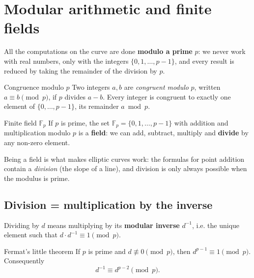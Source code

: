 
\section{Modular arithmetic and finite fields}
\label{sec:modarith}

All the computations on the curve are done \textbf{modulo a prime} $p$: we never work with real numbers, only with the integers $\{0, 1, \ldots, p-1\}$, and every result is reduced by taking the remainder of the division by $p$.

\begin{frameddefn}[label={def:congruence}]{Congruence modulo $p$}
  Two integers $a, b$ are \textit{congruent modulo} $p$, written $a \equiv b \pmod p$, if $p$ divides $a - b$. Every integer is congruent to exactly one element of $\{0, \ldots, p-1\}$, its remainder $a \bmod p$.
\end{frameddefn}

\begin{frameddefn}[label={def:field}]{Finite field $\mathbb{F}_p$}
  If $p$ is prime, the set $\mathbb{F}_p = \{0, 1, \ldots, p-1\}$ with addition and multiplication modulo $p$ is a \textbf{field}: we can add, subtract, multiply and \textbf{divide} by any non-zero element.
\end{frameddefn}

Being a field is what makes elliptic curves work: the formulas for point addition contain a \textit{division} (the slope of a line), and division is only always possible when the modulus is prime.

\subsection{Division = multiplication by the inverse}

Dividing by $d$ means multiplying by its \textbf{modular inverse} $d^{-1}$, i.e. the unique element such that $d \cdot d^{-1} \equiv 1 \pmod p$.

\begin{framedthm}[label={thm:fermat}]{Fermat's little theorem}
  If $p$ is prime and $d \not\equiv 0 \pmod p$, then $d^{p-1} \equiv 1 \pmod p$. Consequently
  \[
    d^{-1} \equiv d^{p-2} \pmod p .
  \]
\end{framedthm}

